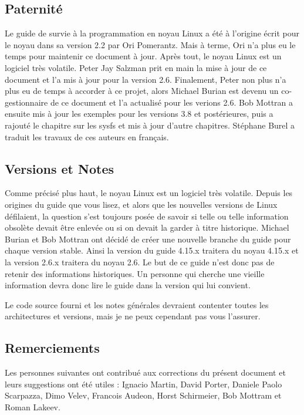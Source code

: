 \documentclass[11pt]{article}
\begin{document}
\subsection*{Paternité}
\label{sec-1-1}

Le guide de survie à la programmation en noyau Linux a été à l'origine écrit pour le noyau dans sa version 2.2 par Ori Pomerantz. Mais à terme, Ori n'a plus eu le temps pour maintenir ce document à jour. Après tout, le noyau Linux est un logiciel très volatile. Peter Jay Salzman prit en main la mise à jour de ce document et l'a mis à jour pour la version 2.6. Finalement, Peter non plus n'a plus eu de temps à accorder à ce projet, alors Michael Burian est devenu un co-gestionnaire de ce document et l'a actualisé pour les verions 2.6. Bob Mottran a ensuite mis à jour les exemples pour les versions 3.8 et postérieures, puis a rajouté le chapitre sur les sysfs et mis à jour d'autre chapitres. Stéphane Burel a traduit les travaux de ces auteurs en français.

\subsection*{Versions et Notes}
\label{sec-1-2}

Comme précisé plus haut, le noyau Linux est un logiciel très volatile. Depuis les origines du guide que vous lisez, et alors que les nouvelles versions de Linux défilaient, la question s'est toujours posée de savoir si telle ou telle information obsolète devait être enlevée ou si on devait la garder à titre historique. Michael Burian et Bob Mottran ont décidé de créer une nouvelle branche du guide pour chaque version stable. Ainsi la version du guide 4.15.x traitera du noyau 4.15.x et la version 2.6.x traitera du noyau 2.6. Le but de ce guide n'est donc pas de retenir des informations historiques. Un personne qui cherche une vieille information devra donc lire le guide dans la version qui lui convient.

Le code source fourni et les notes générales devraient contenter toutes les architectures et versions, mais je ne peux cependant pas vous l'assurer.

\subsection*{Remerciements}
\label{sec-1-3}

Les personnes suivantes ont contribué aux corrections du présent document et leurs suggestions ont été utiles : Ignacio Martin, David Porter, Daniele Paolo Scarpazza, Dimo Velev, Francois Audeon, Horst Schirmeier, Bob Mottram et Roman Lakeev.
\end{document}
